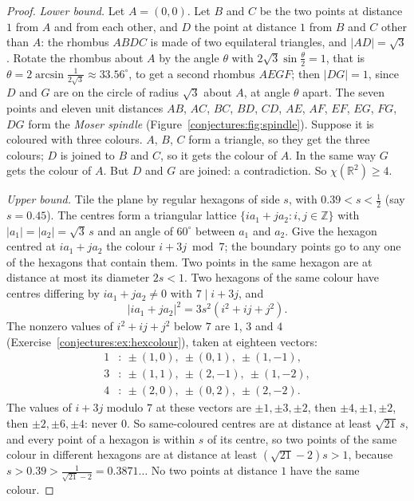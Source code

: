 \begin{proof}
\emph{Lower bound.} Let $A=(0,0)$. Let $B$ and $C$ be the two points at distance $1$ from $A$ and from each other, and $D$ the point at distance $1$ from
$B$ and $C$ other than $A$: the rhombus $ABDC$ is made of two equilateral triangles, and $|AD|=\sqrt3$. Rotate the rhombus about $A$ by the angle
$\theta$ with $2\sqrt3\sin\frac\theta2=1$, that is $\theta=2\arcsin\frac1{2\sqrt3}\approx33.56^\circ$, to get a second rhombus $AEGF$; then $|DG|=1$,
since $D$ and $G$ are on the circle of radius $\sqrt3$ about $A$, at angle $\theta$ apart. The seven points and eleven unit distances
$AB$, $AC$, $BC$, $BD$, $CD$, $AE$, $AF$, $EF$, $EG$, $FG$, $DG$ form the \emph{Moser spindle} (Figure~\ref{conjectures:fig:spindle}). Suppose it is coloured with
three colours. $A$, $B$, $C$ form a triangle, so they get the three colours; $D$ is joined to $B$ and $C$, so it gets the colour of $A$. In the same way
$G$ gets the colour of $A$. But $D$ and $G$ are joined: a contradiction. So $\chi(\mathbb R^2)\ge4$.

\emph{Upper bound.} Tile the plane by regular hexagons of side $s$, with $0.39<s<\frac12$ (say $s=0.45$). The centres form a triangular lattice
$\{ia_1+ja_2:i,j\in\mathbb Z\}$ with $|a_1|=|a_2|=\sqrt3\,s$ and an angle of $60^\circ$ between $a_1$ and $a_2$. Give the hexagon centred at $ia_1+ja_2$
the colour $i+3j\bmod7$; the boundary points go to any one of the hexagons that contain them. Two points in the same hexagon are at distance at most its
diameter $2s<1$. Two hexagons of the same colour have centres differing by $ia_1+ja_2\ne0$ with $7\mid i+3j$, and
\[
|ia_1+ja_2|^2=3s^2(i^2+ij+j^2).
\]
The nonzero values of $i^2+ij+j^2$ below $7$ are $1$, $3$ and $4$ (Exercise~\ref{conjectures:ex:hexcolour}), taken at eighteen vectors:
\[
\begin{aligned}
1&:\ \pm(1,0),\ \pm(0,1),\ \pm(1,-1),\\
3&:\ \pm(1,1),\ \pm(2,-1),\ \pm(1,-2),\\
4&:\ \pm(2,0),\ \pm(0,2),\ \pm(2,-2).
\end{aligned}
\]
The values of $i+3j$ modulo $7$ at these vectors are $\pm1,\pm3,\pm2$, then $\pm4,\pm1,\pm2$, then $\pm2,\pm6,\pm4$: never $0$.
So same-coloured centres are at distance at least $\sqrt{21}\,s$, and every point of a hexagon is within $s$ of its centre, so two points of the same
colour in different hexagons are at distance at least $(\sqrt{21}-2)s>1$, because $s>0.39>\frac1{\sqrt{21}-2}=0.3871\ldots$ No two points at distance $1$
have the same colour.
\end{proof}

